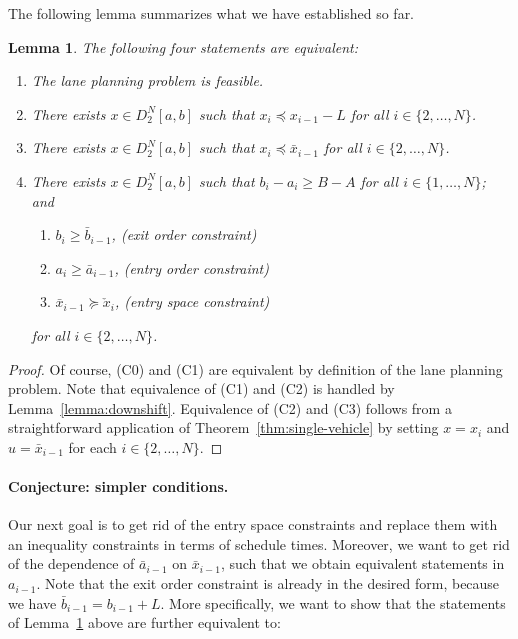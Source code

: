 \documentclass{report}
\theoremstyle{definition}
\theoremstyle{plain}
\newtheorem{lemma}{Lemma}[chapter]
\begin{document}
%
The following lemma summarizes what we have established so far.

\begin{lemma}\label{lemma:summary}
  The following four statements are equivalent:

  \begin{enumerate}[leftmargin=3em]
    \item[(C0)] The lane planning problem is feasible.
    \item[(C1)] There exists $x \in D_{2}^{N}[a, b]$ such that $x_{i} \preceq x_{i-1} - L$ for all $i \in \{2, \dots, N\}$.
    \item[(C2)] There exists $x \in D_{2}^{N}[a, b]$ such that $x_{i} \preceq \bar{x}_{i-1}$ for all $i \in \{2, \dots, N\}$.

    \item[(C3)] There exists $x \in D_{2}^{N}[a, b]$ such that
          $b_{i} - a_{i} \geq B - A$ for all $i \in \{1, \dots, N\}$; and
    \TabPositions{2cm}
    \begin{enumerate}[label=(\roman*)\quad,leftmargin=3em,midpenalty=10]
      \item $b_{i} \geq \bar{b}_{i-1}$, \tab (exit order constraint)
      \item $a_{i} \geq \bar{a}_{i-1}$, \tab (entry order constraint)
      \item $\bar{x}_{i-1} \succeq \check{x}_{i}$, \tab (entry space constraint)
    \end{enumerate}
    for all $i \in \{2, \dots, N\}$.

  \end{enumerate}
\end{lemma}
\begin{proof}
  Of course, (C0) and (C1) are equivalent by definition of the lane planning
  problem. Note that equivalence of (C1) and (C2) is handled by Lemma~\ref{lemma:downshift}.
  Equivalence of (C2) and (C3) follows from a straightforward application of
  Theorem~\ref{thm:single-vehicle} by setting $x=x_i$ and $u=\bar{x}_{i-1}$ for
  each $i \in \{2, \dots, N\}$.
\end{proof}

\paragraph{Conjecture: simpler conditions.}
Our next goal is to get rid of the entry space constraints and replace them
with an inequality constraints in terms of schedule times.
%
Moreover, we want to get rid of the dependence of $\bar{a}_{i-1}$ on
$\bar{x}_{i-1}$, such that we obtain equivalent statements in $a_{i-1}$. Note
that the exit order constraint is already in the desired form, because we have
$\bar{b}_{i-1} = b_{i-1} + L$.
%
More specifically, we want to show that the statements of
Lemma~\ref{lemma:summary} above are further equivalent to:
\end{document}
